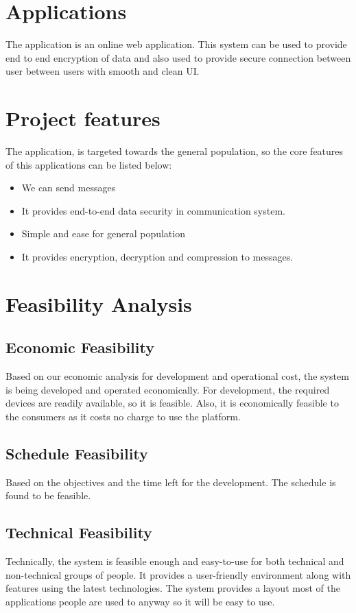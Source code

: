 \section{Applications}
The application is an online web application. This system can be used to provide end to end encryption of data and also used to provide secure connection between user between users with smooth and clean UI.

\section{Project features}
The application, is targeted towards the general population, so the core features of this applications can be listed below:

\vspace{-18pt}
\begin{itemize}
	\item We can send messages
	\item It provides end-to-end data security in communication system.
	\item Simple and ease for general population
	\item It provides encryption, decryption and compression to messages.
\end{itemize}

\section{Feasibility Analysis}

\subsection{Economic Feasibility}
Based on our economic analysis for development and operational cost,
the system is being developed and operated economically. For development,
the required devices are readily available, so it is feasible. Also,
it is economically feasible to the consumers as it costs no charge to use the platform.

\subsection{Schedule Feasibility}
Based on the objectives and the time left for the development.
The schedule is found to be feasible.

\subsection{Technical Feasibility}
Technically, the system is feasible enough and easy-to-use
for both technical and non-technical groups of people. It provides
a user-friendly environment along with features using the latest technologies.
The system provides a layout most of the applications people are used to anyway
so it will be easy to use.


